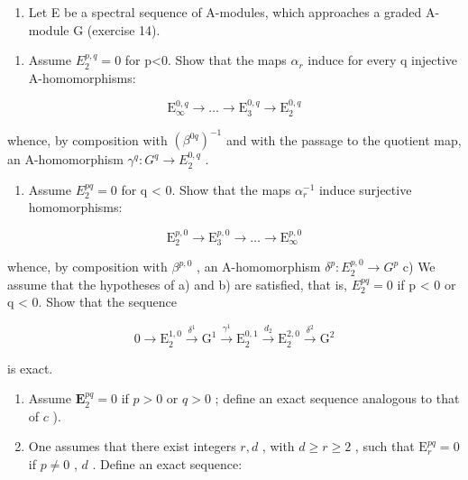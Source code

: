 \begin{enumerate}
\def\labelenumi{\arabic{enumi})}
\setcounter{enumi}{14}
\tightlist
\item
  Let E be a spectral sequence of A-modules, which approaches a graded A-module G (exercise 14).
\end{enumerate}

\begin{enumerate}
\def\labelenumi{\alph{enumi})}
\tightlist
\item
  Assume \(E_{2}^{p,q}=0\) for p\textless0. Show that the maps \(\alpha_{r}\) induce for every q injective A-homomorphisms:
\end{enumerate}

\[
\mathrm{E} _ {\infty} ^ {0, q} \rightarrow \dots \rightarrow \mathrm{E} _ {3} ^ {0, q} \rightarrow \mathrm{E} _ {2} ^ {0, q}
\]

whence, by composition with \((\beta^{0q})^{-1}\) and with the passage to the quotient map, an A-homomorphism \(\gamma^q: G^q \to E_2^{0,q}\) .

\begin{enumerate}
\def\labelenumi{\alph{enumi})}
\setcounter{enumi}{1}
\tightlist
\item
  Assume \(E_{2}^{pq} = 0\) for q \textless{} 0. Show that the maps \(\alpha_{r}^{-1}\) induce surjective homomorphisms:
\end{enumerate}

\[
\mathrm{E} _ {2} ^ {p, 0} \rightarrow \mathrm{E} _ {3} ^ {p, 0} \rightarrow \dots \rightarrow \mathrm{E} _ {\infty} ^ {p, 0}
\]

whence, by composition with \(\beta^{p,0}\) , an A-homomorphism \(\delta^p:E_2^{p,0}\to G^p\) c) We assume that the hypotheses of a) and b) are satisfied, that is, \(E_{2}^{pq} = 0\) if p \textless{} 0 or q \textless{} 0. Show that the sequence

\[
0 \rightarrow \mathrm{E} _ {2} ^ {1, 0} \xrightarrow {\delta^ {1}} \mathrm{G} ^ {1} \xrightarrow {\gamma^ {1}} \mathrm{E} _ {2} ^ {0, 1} \xrightarrow {d _ {2}} \mathrm{E} _ {2} ^ {2, 0} \xrightarrow {\delta^ {2}} \mathrm{G} ^ {2}
\]

is exact.

\begin{enumerate}
\def\labelenumi{\alph{enumi})}
\setcounter{enumi}{3}
\item
  Assume \(\mathbf{E}_2^{pq} = 0\) if \(p > 0\) or \(q > 0\) ; define an exact sequence analogous to that of \(c\) ).
\item
  One assumes that there exist integers \(r, d\) , with \(d \geqslant r \geqslant 2\) , such that \(\mathrm{E}_{r}^{pq} = 0\) if \(p \neq 0\) , \(d\) . Define an exact sequence:
\end{enumerate}

